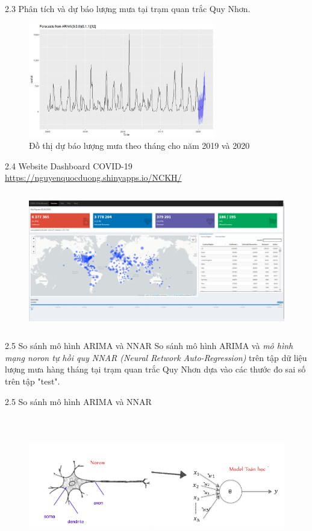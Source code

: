 \documentclass[notheorems,envcountsect,hyperref=unicode]{beamer}
\begin{document}
\begin{frame}{2.3 Phân tích và dự báo lượng mưa tại trạm quan trắc Quy Nhơn.}
	\begin{figure}[!htb]
		\centering
		\includegraphics[width=1\linewidth,height=5cm]{V9} 
		\caption{Đồ thị dự báo lượng mưa theo tháng cho năm 2019 và 2020}
	\end{figure}
\end{frame}

\begin{frame}{2.4 Website Dashboard COVID-19}
\url{https://nguyenquocduong.shinyapps.io/NCKH/}	
\pause
	\begin{figure}[!htb]
		\centering
		\includegraphics[width=1\linewidth,height=6cm]{duong10} 
	\end{figure}
\end{frame}

\begin{frame}{2.5 So sánh mô hình ARIMA và NNAR}
So sánh mô hình ARIMA và \textit{mô hình mạng noron tự hồi quy NNAR (Neural Retwork Auto-Regression)} trên tập dữ liệu lượng mưa hàng tháng tại trạm quan trắc Quy Nhơn dựa vào các thước đo sai số trên tập "test".
\end{frame}

\begin{frame}{2.5 So sánh mô hình ARIMA và NNAR}
	\begin{figure}[!htb]
	\centering
	\includegraphics[width=1\linewidth,height=6cm]{noron} 
\end{figure}
\end{frame}
\end{document}
